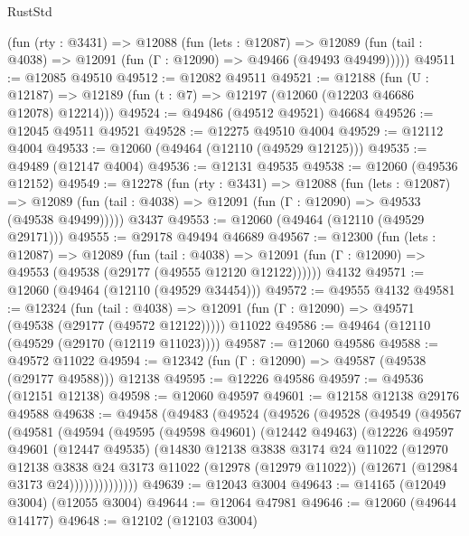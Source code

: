 \begin{lexlean}{RustStd}
\begin{coremodule}
    (fun (rty : @3431) =>
    @12088
      (fun (lets : @12087) =>
      @12089 (fun (tail : @4038) => @12091 (fun (Γ : @12090) => @49466 (@49493 @49499)))))
@49511 := @12085 @49510
@49512 := @12082 @49511
@49521 := @12188
    (fun (U : @12187) => @12189 (fun (t : @7) => @12197 (@12060 (@12203 @46686 @12078) @12214)))
@49524 := @49486 (@49512 @49521) @46684
@49526 := @12045 @49511 @49521
@49528 := @12275 @49510 @4004
@49529 := @12112 @4004
@49533 := @12060 (@49464 (@12110 (@49529 @12125)))
@49535 := @49489 (@12147 @4004)
@49536 := @12131 @49535
@49538 := @12060 (@49536 @12152)
@49549 := @12278
    (fun (rty : @3431) =>
    @12088
      (fun (lets : @12087) =>
      @12089 (fun (tail : @4038) => @12091 (fun (Γ : @12090) => @49533 (@49538 @49499)))))
    @3437
@49553 := @12060 (@49464 (@12110 (@49529 @29171)))
@49555 := @29178 @49494 @46689
@49567 := @12300
    (fun (lets : @12087) =>
    @12089
      (fun (tail : @4038) =>
      @12091 (fun (Γ : @12090) => @49553 (@49538 (@29177 (@49555 @12120 @12122))))))
    @4132
@49571 := @12060 (@49464 (@12110 (@49529 @34454)))
@49572 := @49555 @4132
@49581 := @12324
    (fun (tail : @4038) => @12091 (fun (Γ : @12090) => @49571 (@49538 (@29177 (@49572 @12122)))))
    @11022
@49586 := @49464 (@12110 (@49529 (@29170 (@12119 @11023))))
@49587 := @12060 @49586
@49588 := @49572 @11022
@49594 := @12342 (fun (Γ : @12090) => @49587 (@49538 (@29177 @49588))) @12138
@49595 := @12226 @49586
@49597 := @49536 (@12151 @12138)
@49598 := @12060 @49597
@49601 := @12158 @12138 @29176 @49588
@49638 := @49458
    (@49483
      (@49524
        (@49526
          (@49528
            (@49549
              (@49567
                (@49581
                  (@49594
                    (@49595
                      (@49598 @49601)
                      (@12442 @49463)
                      (@12226
                        @49597
                        @49601
                        (@12447 @49535)
                        (@14830
                          @12138
                          @3838
                          @3174
                          @24
                          @11022
                          (@12970
                            @12138
                            @3838
                            @24
                            @3173
                            @11022
                            (@12978 (@12979 @11022))
                            (@12671 (@12984 @3173 @24))))))))))))))
@49639 := @12043 @3004
@49643 := @14165 (@12049 @3004) (@12055 @3004)
@49644 := @12064 @47981
@49646 := @12060 (@49644 @14177)
@49648 := @12102 (@12103 @3004)

\end{coremodule}
\end{lexlean}
